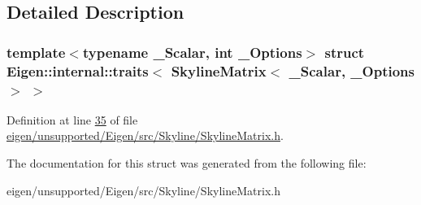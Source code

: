 \subsection{Detailed Description}
\subsubsection*{template$<$typename \+\_\+\+Scalar, int \+\_\+\+Options$>$\newline
struct Eigen\+::internal\+::traits$<$ Skyline\+Matrix$<$ \+\_\+\+Scalar, \+\_\+\+Options $>$ $>$}



Definition at line \hyperlink{eigen_2unsupported_2_eigen_2src_2_skyline_2_skyline_matrix_8h_source_l00035}{35} of file \hyperlink{eigen_2unsupported_2_eigen_2src_2_skyline_2_skyline_matrix_8h_source}{eigen/unsupported/\+Eigen/src/\+Skyline/\+Skyline\+Matrix.\+h}.



The documentation for this struct was generated from the following file\+:\begin{DoxyCompactItemize}
\item 
eigen/unsupported/\+Eigen/src/\+Skyline/\+Skyline\+Matrix.\+h\end{DoxyCompactItemize}
